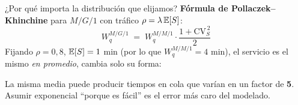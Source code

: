 \documentclass[aspectratio=1610, 10pt]{beamer}
\begin{document}
\begin{frame}{¿Por qué importa la distribución que elijamos?}
  \textbf{Fórmula de Pollaczek--Khinchine} para $M/G/1$ con tráfico $\rho=\lambda\,\mathbb{E}[S]$:
  \[
    W_q^{M/G/1} \;=\; W_q^{M/M/1}\cdot\frac{1+\mathrm{CV}_S^{\,2}}{2}
  \]
  Fijando $\rho=0{,}8$, $\mathbb{E}[S]=1$ min (por lo que $W_q^{M/M/1}=4$ min), el servicio es el mismo
  \emph{en promedio}, cambia solo su forma:

  \begin{center}
  \end{center}

  \begin{alertabox}[Moraleja]
    La misma media puede producir tiempos en cola que varían en un factor de \textbf{5}.
    Asumir exponencial ``porque es fácil'' es el error más caro del modelado.
  \end{alertabox}
\end{frame}

\end{document}
